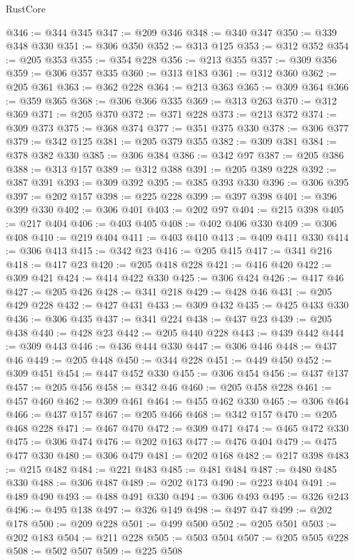 \begin{lexlean}{RustCore}
\begin{coremodule}
@346 := @344 @345
@347 := @209 @346
@348 := @340 @347
@350 := @339 @348 @330
@351 := @306 @350
@352 := @313 @125
@353 := @312 @352
@354 := @205 @353
@355 := @354 @228
@356 := @213 @355
@357 := @309 @356
@359 := @306 @357 @335
@360 := @313 @183
@361 := @312 @360
@362 := @205 @361
@363 := @362 @228
@364 := @213 @363
@365 := @309 @364
@366 := @359 @365
@368 := @306 @366 @335
@369 := @313 @263
@370 := @312 @369
@371 := @205 @370
@372 := @371 @228
@373 := @213 @372
@374 := @309 @373
@375 := @368 @374
@377 := @351 @375 @330
@378 := @306 @377
@379 := @342 @125
@381 := @205 @379 @355
@382 := @309 @381
@384 := @378 @382 @330
@385 := @306 @384
@386 := @342 @97
@387 := @205 @386
@388 := @313 @157
@389 := @312 @388
@391 := @205 @389 @228
@392 := @387 @391
@393 := @309 @392
@395 := @385 @393 @330
@396 := @306 @395
@397 := @202 @157
@398 := @225 @228
@399 := @397 @398
@401 := @396 @399 @330
@402 := @306 @401
@403 := @202 @97
@404 := @215 @398
@405 := @217 @404
@406 := @403 @405
@408 := @402 @406 @330
@409 := @306 @408
@410 := @219 @404
@411 := @403 @410
@413 := @409 @411 @330
@414 := @306 @413
@415 := @342 @23
@416 := @205 @415
@417 := @341 @216
@418 := @417 @23
@420 := @205 @418 @228
@421 := @416 @420
@422 := @309 @421
@424 := @414 @422 @330
@425 := @306 @424
@426 := @417 @46
@427 := @205 @426
@428 := @341 @218
@429 := @428 @46
@431 := @205 @429 @228
@432 := @427 @431
@433 := @309 @432
@435 := @425 @433 @330
@436 := @306 @435
@437 := @341 @224
@438 := @437 @23
@439 := @205 @438
@440 := @428 @23
@442 := @205 @440 @228
@443 := @439 @442
@444 := @309 @443
@446 := @436 @444 @330
@447 := @306 @446
@448 := @437 @46
@449 := @205 @448
@450 := @344 @228
@451 := @449 @450
@452 := @309 @451
@454 := @447 @452 @330
@455 := @306 @454
@456 := @437 @137
@457 := @205 @456
@458 := @342 @46
@460 := @205 @458 @228
@461 := @457 @460
@462 := @309 @461
@464 := @455 @462 @330
@465 := @306 @464
@466 := @437 @157
@467 := @205 @466
@468 := @342 @157
@470 := @205 @468 @228
@471 := @467 @470
@472 := @309 @471
@474 := @465 @472 @330
@475 := @306 @474
@476 := @202 @163
@477 := @476 @404
@479 := @475 @477 @330
@480 := @306 @479
@481 := @202 @168
@482 := @217 @398
@483 := @215 @482
@484 := @221 @483
@485 := @481 @484
@487 := @480 @485 @330
@488 := @306 @487
@489 := @202 @173
@490 := @223 @404
@491 := @489 @490
@493 := @488 @491 @330
@494 := @306 @493
@495 := @326 @243
@496 := @495 @138
@497 := @326 @149
@498 := @497 @47
@499 := @202 @178
@500 := @209 @228
@501 := @499 @500
@502 := @205 @501
@503 := @202 @183
@504 := @211 @228
@505 := @503 @504
@507 := @205 @505 @228
@508 := @502 @507
@509 := @225 @508

\end{coremodule}
\end{lexlean}
